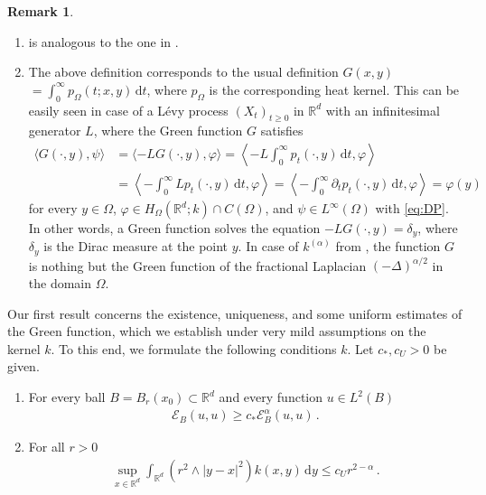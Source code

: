 \documentclass[reqno]{amsart}
\makeatletter
\newcommand{\mylabel}[2]{(#2)\def\@currentlabel{#2}\label{#1}}
\theoremstyle{plain}
\theoremstyle{definition}
\newtheorem*{remark*}{Remark}
\numberwithin{equation}{section}
\newcommand{\Rd}{\mathbb{R}^d}
\newcommand{\dy} {\, \mathrm{d}y}
\newcommand{\dt} {\, \mathrm{d}t}
\newcommand{\cl} {c_{\ast}}
\newcommand{\cU} {c_U}
\makeatother
\begin{document}
\begin{remark*}{ \ } \vspace*{-2ex}
\begin{enumerate}
	\item {} is analogous to the one in \cite[Section 6]{LSW63}. 
	\item The above definition corresponds to the usual definition $G(x,y)$ $= \int_0^{\infty} p_\Omega(t;x,y) \dt$, where $ p_\Omega $ is the corresponding heat kernel. This can be easily seen in case of a L\'evy process $(X_t)_{t \geq 0}$ in $\Rd$ with an infinitesimal generator $L$, where the Green function $G$ satisfies
	\begin{align*}
	\langle G(\cdot, y), \psi \rangle
	&= \langle -LG(\cdot, y), \varphi \rangle
	= \left\langle -L\int_0^\infty p_t(\cdot, y)\dt, \varphi \right\rangle \\
	&= \left\langle -\int_0^\infty Lp_t(\cdot, y)\dt, \varphi \right \rangle
	= \left\langle -\int_0^\infty \partial_t p_t(\cdot, y)\dt, \varphi \right\rangle
	= \varphi(y)
	\end{align*}
for every $y \in \Omega$, $\varphi \in H_{\Omega}(\Rd; k) \cap C(\Omega)$, and $\psi \in L^{\infty}(\Omega)$ with \eqref{eq:DP}. In other words, a Green function solves the equation $-LG(\cdot, y) = \delta_y$, where $\delta_{y}$ is the Dirac measure at the point $y$. In case of $k^{(\alpha)}$ from , the function $G$ is nothing but the Green function of the fractional Laplacian $(-\Delta)^{\alpha/2}$ in the domain $\Omega$.
\end{enumerate}
\end{remark*}


Our first result concerns the existence, uniqueness, and some uniform estimates of the Green function, which we establish under very mild assumptions on the kernel $k$. To this end, we formulate the following conditions $k$. Let $\cl, \cU > 0$ be given.

\begin{enumerate}
	\item [\mylabel{assum:E-lower}{$\mathcal{E}_\geq$}] 
	For every ball $B = B_r(x_0) \subset \Rd$ and every function $u \in L^2(B)$
	\begin{align*}
	\mathcal{E}_B (u, u) \geq \cl \mathcal{E}^{\alpha}_B (u, u) \,.
	\end{align*}

	\item [\mylabel{assum:U1}{U1}]
	For all $r > 0$
	\begin{align*}
	\sup_{x \in \Rd} \int_{\Rd} \left( r^2 \land |y-x|^2 \right) k(x,y) \dy
	\leq \cU r^{2-\alpha} \,.
	\end{align*}
\end{enumerate}
\end{document}
